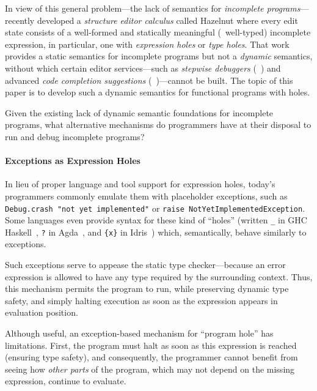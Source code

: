 In view of this general problem---the lack of semantics for \emph{incomplete
programs}---\citet{popl-paper} recently developed a \emph{structure editor
calculus} called Hazelnut where every edit state consists of a well-formed and
statically meaningful (\ie{}~well-typed) incomplete expression, in particular,
one with \emph{expression holes} or \emph{type holes}.
%
That work provides a static semantics for incomplete programs but not a
\emph{dynamic} semantics, without which certain editor services---such as
\emph{stepwise debuggers} (\eg{}~\cite{XXX}) and advanced \emph{code completion
suggestions} (\eg{}~\cite{XXX})---cannot be built.
%
The topic of this paper is to develop such a dynamic semantics for functional
programs with holes.


Given the existing lack of dynamic semantic foundations for incomplete programs,
what alternative mechanisms do programmers have at their disposal to run and
debug incomplete programs?

\paragraph{Exceptions as Expression Holes}
%
In lieu of proper language and tool support for expression holes,
today's programmers commonly emulate them with placeholder exceptions, such as
\verb+Debug.crash "not yet implemented"+ or
\verb+raise NotYetImplementedException+.
%
Some languages even provide syntax for these kind of ``holes''
%
(written \verb+_+ in GHC Haskell~\cite{XXX},
\verb+?+ in Agda~\cite{XXX}, and
\verb+{x}+ in Idris~\cite{XXX})
%
which, semantically, behave similarly to exceptions.

Such exceptions serve to appease the static type checker---because an
error expression is allowed to have any type required by the surrounding
context.
%
Thus, this mechanism permits the program to run, while preserving dynamic type safety, and
simply halting execution as soon as the expression appears in evaluation
position.

Although useful, an exception-based mechanism for ``program hole'' has limitations.
%
First,
the program must halt as soon as this expression is reached (ensuring type safety), and consequently, the programmer cannot benefit from seeing how
\emph{other parts} of the program, which may not depend on the missing expression,
continue to evaluate.

